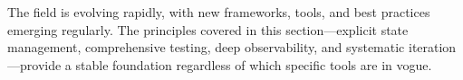 The field is evolving rapidly, with new frameworks, tools, and best practices emerging regularly. The principles covered in this section---explicit state management, comprehensive testing, deep observability, and systematic iteration---provide a stable foundation regardless of which specific tools are in vogue.

